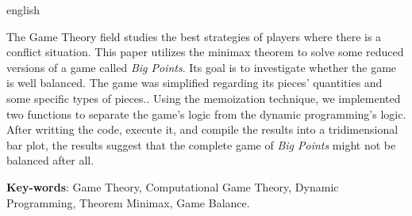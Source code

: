 \begin{resumo}[Abstract]
 \begin{otherlanguage*}{english}
	
The Game Theory field studies the best strategies of players where there is a conflict situation.
This paper utilizes the minimax theorem to solve some reduced versions of a game called \emph{Big Points}.
Its goal is to investigate whether the game is well balanced.
The game was simplified regarding its pieces' quantities and some specific types of pieces..
Using the memoization technique, we implemented two functions to separate the game's logic from the dynamic programming's logic.
After writting the code, execute it, and compile the results into a tridimensional bar plot, the results suggest that the complete game of \emph{Big Points} might not be balanced after all.


   \vspace{\onelineskip}

   \noindent
   \textbf{Key-words}: Game Theory, Computational Game Theory, Dynamic Programming, Theorem Minimax, Game Balance.
 \end{otherlanguage*}
\end{resumo}
